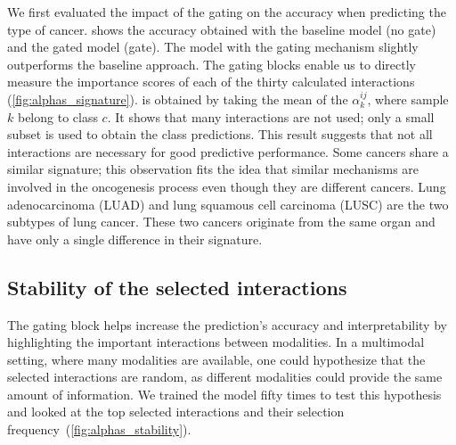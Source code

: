 \documentclass[../main.tex]{subfiles}
\begin{document}
		We first evaluated the impact of the gating on the accuracy when predicting the type of cancer.
		 shows the accuracy obtained with the baseline model (no gate) and the gated model (gate).
		The model with the gating mechanism slightly outperforms the baseline approach.
		The gating blocks enable us to directly measure the importance scores of each of the thirty calculated interactions (\cref{fig:alphas_signature}).
		 is obtained by taking the mean of the \(\alpha^{ij}_k\), where sample \(k\) belong to class \(c\).
		It shows that many interactions are not used; only a small subset is used to obtain the class predictions.
		This result suggests that not all interactions are necessary for good predictive performance.
		Some cancers share a similar signature; this observation fits the idea that similar mechanisms are involved in the oncogenesis process even though they are different cancers.
		Lung adenocarcinoma (LUAD) and lung squamous cell carcinoma (LUSC) are the two subtypes of lung cancer.
		These two cancers originate from the same organ and have only a single difference in their signature.

	\subsection{Stability of the selected interactions}
		The gating block helps increase the prediction's accuracy and interpretability by highlighting the important interactions between modalities.
		In a multimodal setting, where many modalities are available, one could hypothesize that the selected interactions are random, as different modalities could provide the same amount of information.
		We trained the model fifty times to test this hypothesis and looked at the top selected interactions and their selection frequency~(\cref{fig:alphas_stability}).
\end{document}

